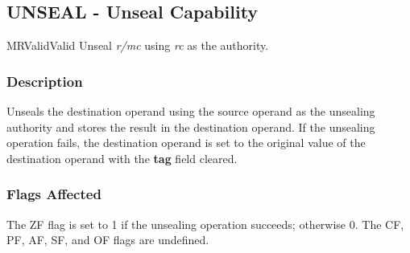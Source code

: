 \clearpage
{}
{}
\subsection*{UNSEAL - Unseal Capability}

\begin{x86opcodetable}
  {MR}{Valid}{Valid}
  {Unseal \emph{r/mc} using \emph{rc} as the authority}.
\end{x86opcodetable}

\begin{x86opentable}
\end{x86opentable}

\subsubsection*{Description}

Unseals the destination operand using the source operand as the
unsealing authority and stores the result in the destination operand.
If the unsealing operation fails, the destination operand is set to
the original value of the destination operand with the \textbf{tag}
field cleared.

\subsubsection*{Flags Affected}

The ZF flag is set to 1 if the unsealing operation succeeds; otherwise
0.  The CF, PF, AF, SF, and OF flags are undefined.
